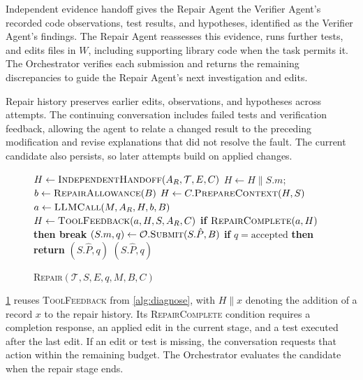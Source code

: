 \documentclass{article}
\begin{document}
{
\setlength{\intextsep}{0pt}

Independent evidence handoff gives the Repair Agent the Verifier Agent's recorded code observations, test results, and hypotheses, identified as the Verifier Agent's findings. The Repair Agent reassesses this evidence, runs further tests, and edits files in $W$, including supporting library code when the task permits it. The Orchestrator verifies each submission and returns the remaining discrepancies to guide the Repair Agent's next investigation and edits.

Repair history preserves earlier edits, observations, and hypotheses across attempts. The continuing conversation includes failed tests and verification feedback, allowing the agent to relate a changed result to the preceding modification and revise explanations that did not resolve the fault. The current candidate also persists, so later attempts build on applied changes.

\begin{figure}
\begin{minipage}{\linewidth}
\begin{algorithm}[H]
\caption{\textsc{Repair}$(\mathcal T,S,E,q,M,B,C)$}
\label{alg:repair}
\raggedright
\small
\begin{algorithmic}[1]
\State $H\gets\Call{IndependentHandoff}{A_R,\mathcal T,E,C}$
  \State $H\gets H\mathbin{\|}S.m$; $b\gets\Call{RepairAllowance}{B}$
    \State $H\gets C.\Call{PrepareContext}{H,S}$
    \State $a\gets\Call{LLMCall}{M,A_R,H,b,B}$ 
    \State $H\gets\Call{ToolFeedback}{a,H,S,A_R,C}$
    \State \textbf{if} $\Call{RepairComplete}{a,H}$ \textbf{then break}
  \EndWhile
  \State $(S.m,q)\gets\mathcal O.\Call{Submit}{S.\hat P,B}$
  \State \textbf{if} $q=\mathrm{accepted}$ \textbf{then return} $(S.\hat P,q)$
\EndWhile
\State \Return $(S.\hat P,q)$
\end{algorithmic}
\end{algorithm}
\end{minipage}
\end{figure}
\cref{alg:repair} reuses \textsc{ToolFeedback} from \cref{alg:diagnose}, with $H\mathbin{\|}x$ denoting the addition of a record $x$ to the repair history. Its \textsc{RepairComplete} condition requires a completion response, an applied edit in the current stage, and a test executed after the last edit. If an edit or test is missing, the conversation requests that action within the remaining budget. The Orchestrator evaluates the candidate when the repair stage ends.\par}
\end{document}
